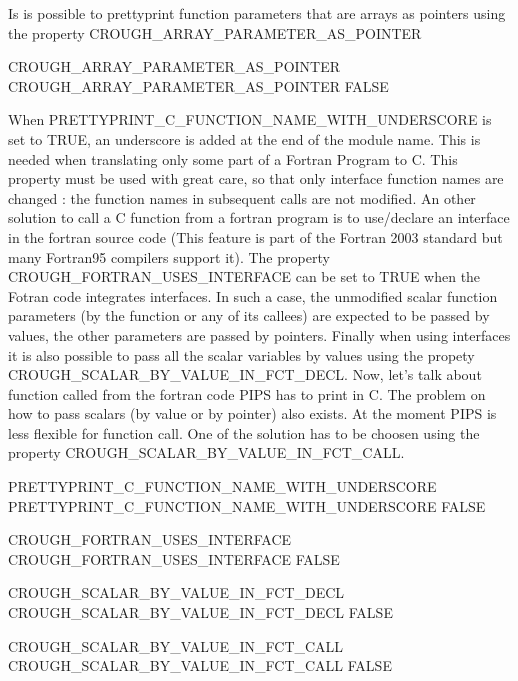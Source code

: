 \documentclass[a4paper]{report}
\begin{document}
Is is possible to prettyprint function parameters that are arrays as pointers
using the property CROUGH\_ARRAY\_PARAMETER\_AS\_POINTER

\begin{PipsProp}{CROUGH_ARRAY_PARAMETER_AS_POINTER}
CROUGH_ARRAY_PARAMETER_AS_POINTER FALSE
\end{PipsProp}

When PRETTYPRINT\_C\_FUNCTION\_NAME\_WITH\_UNDERSCORE is set to TRUE, an
underscore is added at the end of the module name. This is needed when
translating only some part of a Fortran Program to C. This property must be
used with great care, so that only interface function names are changed : the
function names in subsequent calls are not modified. An other solution to call
a C function from a fortran program is to use/declare an interface in the
fortran source code (This feature is part of the Fortran 2003 standard
but many Fortran95 compilers support it). The property
CROUGH\_FORTRAN\_USES\_INTERFACE can be set to TRUE when the Fotran code
integrates interfaces. In such a case, the unmodified scalar function
parameters (by the function or any of its callees) are expected to be passed by
values, the other parameters are passed by pointers. Finally when using
interfaces it is also possible to pass all the scalar variables by values using
the propety CROUGH\_SCALAR\_BY\_VALUE\_IN\_FCT\_DECL. Now, let's talk about function
called from the fortran code PIPS has to print in C. The problem on
how to pass scalars (by value or by pointer) also exists. At the moment PIPS
is less flexible for function call. One of the solution has to be choosen
using the property CROUGH\_SCALAR\_BY\_VALUE\_IN\_FCT\_CALL.

\begin{PipsProp}{PRETTYPRINT_C_FUNCTION_NAME_WITH_UNDERSCORE}
PRETTYPRINT_C_FUNCTION_NAME_WITH_UNDERSCORE FALSE
\end{PipsProp}

\begin{PipsProp}{CROUGH_FORTRAN_USES_INTERFACE}
CROUGH_FORTRAN_USES_INTERFACE FALSE
\end{PipsProp}

\begin{PipsProp}{CROUGH_SCALAR_BY_VALUE_IN_FCT_DECL}
CROUGH_SCALAR_BY_VALUE_IN_FCT_DECL FALSE
\end{PipsProp}

\begin{PipsProp}{CROUGH_SCALAR_BY_VALUE_IN_FCT_CALL}
CROUGH_SCALAR_BY_VALUE_IN_FCT_CALL FALSE
\end{PipsProp}
\end{document}
